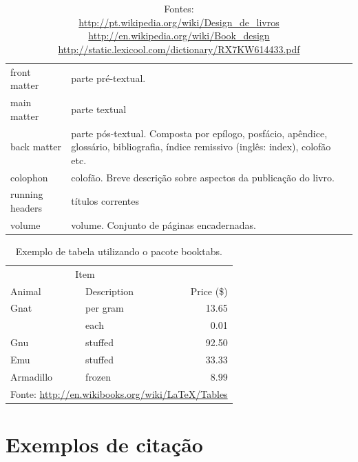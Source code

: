 \documentclass[
	10pt,				%
	openright,			%
	twoside,			%
	a5paper,			%
	english,			%
	french,				%
	spanish,			%
	brazil,				%
]{abntex2}
\begin{document}
\begin{table}
\begin{tabular}{p{5cm}p{5cm}}
front matter & parte pré-textual.\\

main matter & parte textual\\

back matter & parte pós-textual. Composta por epílogo, posfácio, apêndice, glossário, bibliografia, índice remissivo (inglês: index), colofão etc.\\

colophon & colofão. Breve descrição sobre aspectos da publicação do livro. \\

running headers & títulos correntes\\

volume & volume. Conjunto de páginas encadernadas.\\

\bottomrule
\end{tabular}
\caption*{\footnotesize Fontes:\\
\url{http://pt.wikipedia.org/wiki/Design_de_livros}\\
\url{http://en.wikipedia.org/wiki/Book_design}\\
\url{http://static.lexicool.com/dictionary/RX7KW614433.pdf}\\}
\end{table}


\begin{table}
\caption{Exemplo de tabela utilizando o pacote \textsf{booktabs}.}
\centering
\begin{tabular}{llr}
\toprule
\multicolumn{2}{c}{Item} \\
\cmidrule(r){1-2}
Animal    & Description & Price (\$) \\
\midrule
Gnat      & per gram    & 13.65      \\
          & each        & 0.01       \\
Gnu       & stuffed     & 92.50      \\
Emu       & stuffed     & 33.33      \\
Armadillo & frozen      & 8.99       \\
\bottomrule
\multicolumn{3}{l}{\footnotesize Fonte: \url{http://en.wikibooks.org/wiki/LaTeX/Tables}}
\end{tabular}
\end{table}

\chapter{Exemplos de citação}
\end{document}
